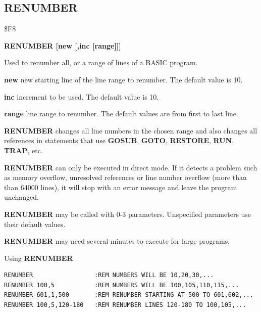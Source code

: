 \subsection{RENUMBER}
\begin{description}[leftmargin=2cm,style=nextline]
\item [Token:] \$F8
\item [Format:] {\bf RENUMBER [new [,inc [range]]]}
\item [Usage:] Used to renumber all, or
               a range of lines of a BASIC program.

               {\bf new } new starting line of the
               line range to renumber.
               The default value is 10.

               {\bf inc } increment to be used.
               The default value is 10.

               {\bf range } line range to renumber.
               The default values are from first to last line.

               {\bf RENUMBER} changes all line numbers in
               the chosen range and also changes all references
               in statements that use {\bf GOSUB}, {\bf GOTO},
               {\bf RESTORE}, {\bf RUN}, {\bf TRAP}, etc.

               {\bf RENUMBER} can only be executed in direct mode.
               If it detects a problem such as memory overflow,
               unresolved references or line number overflow
               (more than than 64000 lines), it will stop with an error
               message and leave the program unchanged.

               {\bf RENUMBER} may be called with 0-3 parameters.
               Unspecified parameters use their default values.

\item [Remarks:] {\bf RENUMBER} may need several
                 minutes to execute for large programs.

\item [Examples:] Using {\bf RENUMBER}
\begin{tcolorbox}[colback=black,coltext=white]
\verbatimfont{\codefont}
\begin{verbatim}
RENUMBER                 :REM NUMBERS WILL BE 10,20,30,...
RENUMBER 100,5           :REM NUMBERS WILL BE 100,105,110,115,...
RENUMBER 601,1,500       :REM RENUMBER STARTING AT 500 TO 601,602,...
RENUMBER 100,5,120-180   :REM RENUMBER LINES 120-180 TO 100,105,...
\end{verbatim}
\end{tcolorbox}
\end{description}

